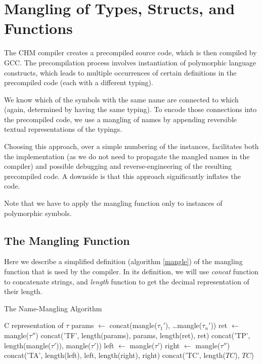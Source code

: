 \chapter{Mangling of Types, Structs, and Functions}

The CHM compiler creates a precompiled source code, which is then compiled by GCC. The precompilation process involves instantiation of polymorphic language constructs, which leads to multiple occurrences of certain definitions in the precompiled code (each with a different typing).

We know which of the symbols with the same name are connected to which (again, determined by having the same typing). To encode those connections into the precompiled code, we use a mangling of names by appending reversible textual representations of the typings.

Choosing this approach, over a simple numbering of the instances, facilitates both the implementation (as we do not need to propagate the mangled names in the compiler) and possible debugging and reverse-engineering of the resulting precompiled code. A downside is that this approach significantly inflates the code.

Note that we have to apply the mangling function only to instances of polymorphic symbols.

\section{The Mangling Function}

Here we describe a simplified definition (algorithm \ref{mangle}) of the mangling function that is used by the compiler. In its definition, we will use \emph{concat} function to concatenate strings, and \emph{length} function to get the decimal representation of their length.

\begin{algorithm}
\caption{The Name-Mangling Algorithm}
\label{mangle}
\begin{algorithmic}[1]
     \Return C representation of $\tau$
        \State params $\gets$ concat(mangle($\tau_1'$), \dots mangle($\tau_n'$))
        \State ret $\gets$ mangle($\tau''$)
        \State \Return concat('TF', length(params), params, length(ret), ret)
        \State \Return concat('TP', length(mangle($\tau'$)), mangle($\tau'$))
        \State left $\gets$ mangle($\tau'$)
        \State right $\gets$ mangle($\tau''$)
        \State \Return concat('TA', length(left), left, length(right), right)
        \State \Return concat('TC', length($TC$), $TC$)
    \EndIf
\EndFunction
\end{algorithmic}
\end{algorithm}
